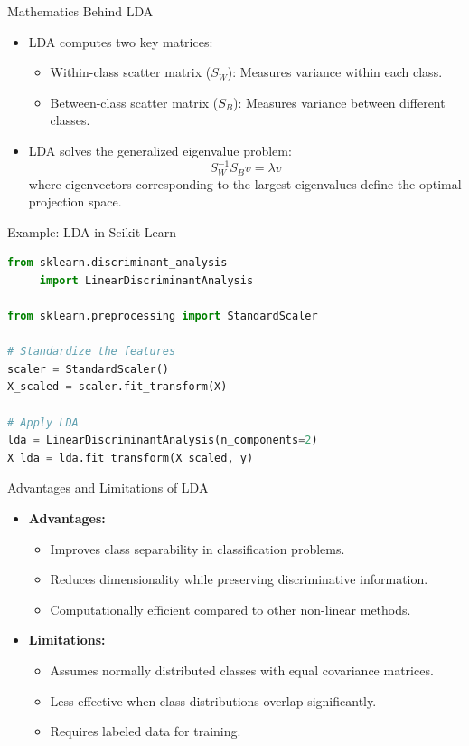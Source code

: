 \documentclass[11pt]{beamer}
\begin{document}
\begin{frame}{Mathematics Behind LDA}
    \begin{itemize}
        \item LDA computes two key matrices:
        \begin{itemize}
            \item Within-class scatter matrix ($S_W$): Measures variance within each class.
            \item Between-class scatter matrix ($S_B$): Measures variance between different classes.
        \end{itemize}
        \item LDA solves the generalized eigenvalue problem:
        \begin{equation}
        S_W^{-1} S_B v = \lambda v
        \end{equation}
        where eigenvectors corresponding to the largest eigenvalues define the optimal projection space.
    \end{itemize}
\end{frame}

\begin{frame}[fragile]{Example: LDA in Scikit-Learn}
    \begin{lstlisting}[language=Python]
from sklearn.discriminant_analysis 
     import LinearDiscriminantAnalysis
     
from sklearn.preprocessing import StandardScaler

# Standardize the features
scaler = StandardScaler()
X_scaled = scaler.fit_transform(X)

# Apply LDA
lda = LinearDiscriminantAnalysis(n_components=2)
X_lda = lda.fit_transform(X_scaled, y)
    \end{lstlisting}
\end{frame}

\begin{frame}{Advantages and Limitations of LDA}
    \begin{itemize}
        \item \textbf{Advantages:}
        \begin{itemize}
            \item Improves class separability in classification problems.
            \item Reduces dimensionality while preserving discriminative information.
            \item Computationally efficient compared to other non-linear methods.
        \end{itemize}
        \item \textbf{Limitations:}
        \begin{itemize}
            \item Assumes normally distributed classes with equal covariance matrices.
            \item Less effective when class distributions overlap significantly.
            \item Requires labeled data for training.
        \end{itemize}
    \end{itemize}
\end{frame}
\end{document}
